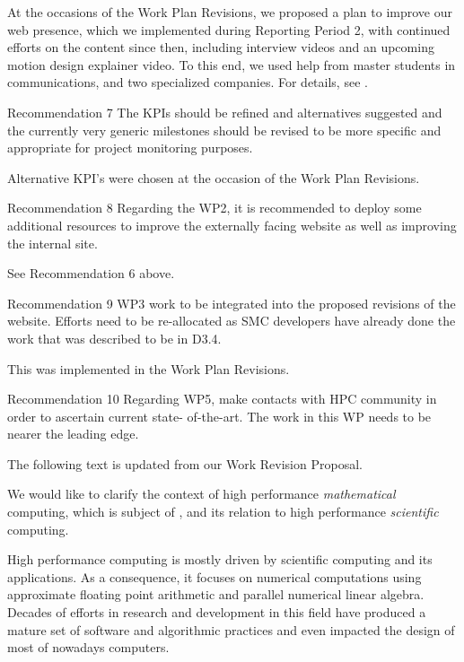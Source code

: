At the occasions of the Work Plan Revisions, we proposed a plan to
improve our web presence, which we implemented during Reporting Period
2, with continued efforts on the content since then, including
interview videos and an upcoming motion design explainer video. To
this end, we used help from master students in communications, and two
specialized companies. For details, see
.

\begin{recommendation}{Recommendation 7}
  The KPIs should be refined and alternatives suggested and the
  currently very generic milestones should be revised to be more
  specific and appropriate for project monitoring purposes.
\end{recommendation}

Alternative KPI's were chosen at the occasion of the Work Plan
Revisions.

\begin{recommendation}{Recommendation 8}
  Regarding the WP2, it is recommended to deploy some additional
  resources to improve the externally facing website as well as
  improving the internal site.
\end{recommendation}

See Recommendation 6 above.

\begin{recommendation}{Recommendation 9}
  WP3 work to be integrated into the proposed revisions of the
  website. Efforts need to be re-allocated as SMC developers have
  already done the work that was described to be in D3.4.
\end{recommendation}

This was implemented in the Work Plan Revisions.

\begin{recommendation}{Recommendation 10}
  Regarding WP5, make contacts with HPC community in order to
  ascertain current state- of-the-art. The work in this WP needs to be
  nearer the leading edge.
\end{recommendation}

The following text is updated from our Work Revision Proposal.

We would like to clarify the context of high performance \emph{mathematical} computing,
which is subject of , and its relation to high
performance \emph{scientific} computing.

High performance computing is mostly driven by scientific computing and its
applications. As a consequence, it focuses on numerical computations using
approximate floating point arithmetic and parallel numerical linear algebra. Decades of
efforts in research and development in this field have produced a mature  set of
software and algorithmic practices and even impacted the design of most of nowadays computers.

